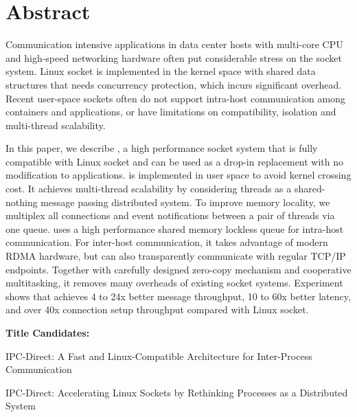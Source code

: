 \section*{Abstract}
Communication intensive applications in data center hosts with multi-core CPU and high-speed networking hardware often put considerable stress on the socket system.
Linux socket is implemented in the kernel space with shared data structures that needs concurrency protection, which incurs significant overhead.
Recent user-space sockets often do not support intra-host communication among containers and applications, or have limitations on compatibility, isolation and multi-thread scalability.

In this paper, we describe \sys{}, a high performance socket system that is fully compatible with Linux socket and can be used as a drop-in replacement with no modification to applications.
\sys{} is implemented in user space to avoid kernel crossing cost.
It achieves multi-thread scalability by considering threads as a shared-nothing message passing distributed system.
To improve memory locality, we multiplex all connections and event notifications between a pair of threads via one queue.
\sys{} uses a high performance shared memory lockless queue for intra-host communication.
For inter-host communication, it takes advantage of modern RDMA hardware, but can also transparently communicate with regular TCP/IP endpoints.
Together with carefully designed zero-copy mechanism and cooperative multitasking, it removes many overheads of existing socket systems.
Experiment shows that \sys achieves 4 to 24x better message throughput, 10 to 60x better latency, and over 40x connection setup throughput compared with Linux socket.


\iffalse
\textbf{Title Candidates:}


IPC-Direct: A Fast and Linux-Compatible Architecture for Inter-Process Communication



IPC-Direct: Accelerating Linux Sockets by Rethinking Processes as a Distributed System


